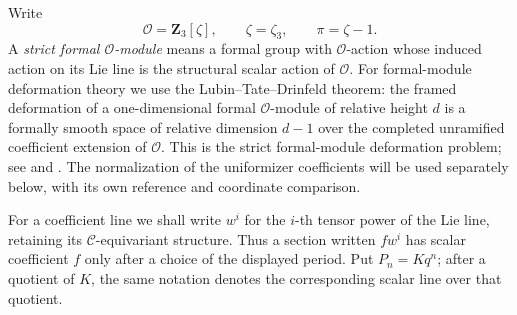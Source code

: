 \documentclass[11pt]{article}
\theoremstyle{definition}
\theoremstyle{remark}
\numberwithin{equation}{section}
\begin{document}
Write
\[
 \mathcal O=\mathbf Z_3[\zeta],\qquad \zeta=\zeta_3,\qquad \pi=\zeta-1.
\]
A \emph{strict formal \(\mathcal O\)-module} means a formal group with
\(\mathcal O\)-action whose induced action on its Lie line is the
structural scalar action of \(\mathcal O\).  For formal-module deformation
theory we use the Lubin--Tate--Drinfeld theorem: the framed deformation
of a one-dimensional formal \(\mathcal O\)-module of relative height \(d\)
is a formally smooth space of relative dimension \(d-1\) over the
completed unramified coefficient extension of \(\mathcal O\).
This is the strict formal-module deformation problem; see
\cite{LubinTate,Drinfeld} and \cite[Theorem~8.4]{RapoportZink}.
The normalization of the uniformizer coefficients will be used
separately below, with its own reference and coordinate comparison.

For a coefficient line we shall write \(w^i\) for the \(i\)-th tensor
power of the Lie line, retaining its \(\mathcal C\)-equivariant
structure.  Thus a section written \(f w^i\) has scalar coefficient
\(f\) only after a choice of the displayed period.
Put \(P_n=Kq^n\); after a quotient of \(K\), the same notation denotes
the corresponding scalar line over that quotient.
\end{document}

